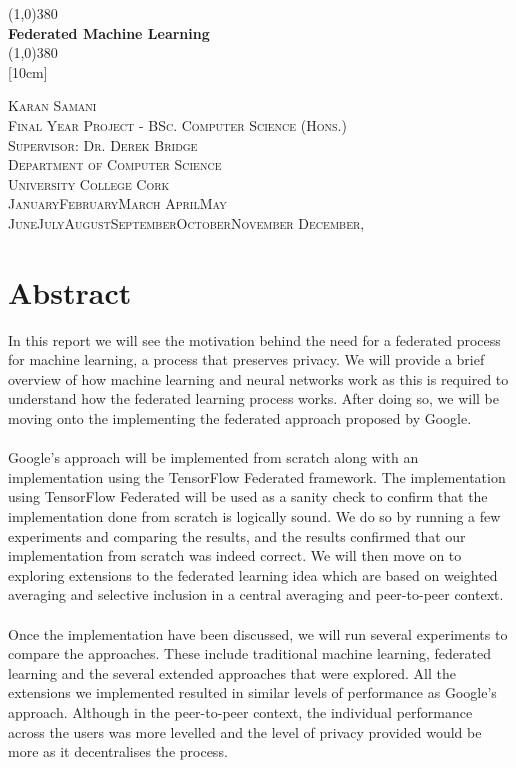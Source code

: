 \documentclass[12pt]{article}
\newcommand{\dateasreq}{\ifcase \month \or January\or February\or March\or %
April\or May \or June\or July\or August\or September\or October\or November\or %
December\fi, \number \year}
\begin{document}
\makeatletter

\begin{titlepage}
	\begin{center}
		\line(1,0){380}\\				
		[0.32cm]
		\huge{\bfseries Federated Machine Learning}\\
		[0.16cm]		
		\line(1,0){380}\\
		[10cm]
	\end{center}
	\begin{center}	
		\textsc{\large Karan Samani}\\
		\textsc{\large Final Year Project - BSc. Computer Science (Hons.)}\\
		\textsc{\large Supervisor: Dr. Derek Bridge}\\
		\textsc{\large Department of Computer Science}\\
		\textsc{\large University College Cork}\\
		\textsc{\large \dateasreq}
	\end{center}
\end{titlepage}
\cleardoublepage

\section*{Abstract}
In this report we will see the motivation behind the need for a federated process for machine learning, a process that preserves privacy. We will provide a brief overview of how machine learning and neural networks work as this is required to understand how the federated learning process works. After doing so, we will be moving onto the implementing the federated approach proposed by Google.
\\\\
Google's approach will be implemented from scratch along with an implementation using the TensorFlow Federated framework. The implementation using TensorFlow Federated will be used as a sanity check to confirm that the implementation done from scratch is logically sound. We do so by running a few experiments and comparing the results, and the results confirmed that our implementation from scratch was indeed correct. We will then move on to exploring extensions to the federated learning idea which are based on weighted averaging and selective inclusion in a central averaging and peer-to-peer context. 
\\\\ 
Once the implementation have been discussed, we will run several experiments to compare the approaches. These include traditional machine learning, federated learning and the several extended approaches that were explored. All the extensions we implemented resulted in similar levels of performance as Google's approach. Although in the peer-to-peer context, the individual performance across the users was more levelled and the level of privacy provided would be more as it decentralises the process. 
\clearpage
\end{document}
